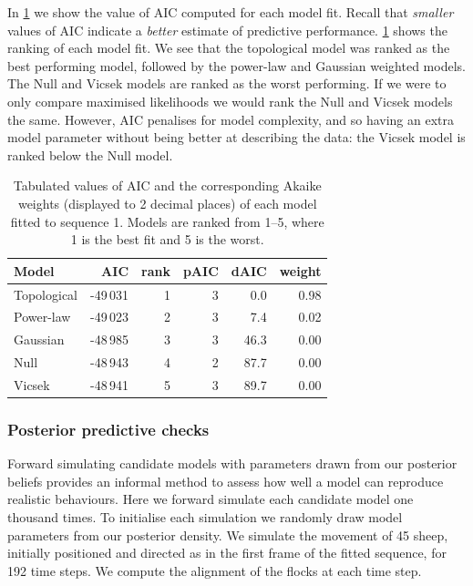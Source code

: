 In \cref{tab:aic_seq1} we show the value of AIC computed for each model fit.
Recall that \emph{smaller} values of AIC indicate a \emph{better} estimate of
predictive performance. \cref{tab:aic_seq1} shows the ranking of each model
fit. We see that the topological model was ranked as the best performing model,
followed by the power-law and Gaussian weighted models. The Null and Vicsek
models are ranked as the worst performing. If we were to only compare maximised
likelihoods we would rank the Null and Vicsek models the same. However, AIC
penalises for model complexity, and so having an extra model parameter without
being better at describing the data: the Vicsek model is ranked below the Null
model.

\begin{table}[tbp]
\begin{tabular}{@{}lrrrrr@{}}
\toprule
Model                       &      AIC & rank & pAIC & dAIC & weight \\
\midrule
Topological                 & -49\,031 &    1 &  3 &  0.0 &   0.98 \\
Power-law                   & -49\,023 &    2 &  3 &  7.4 &   0.02 \\
Gaussian                    & -48\,985 &    3 &  3 & 46.3 &   0.00 \\
Null                        & -48\,943 &    4 &  2 & 87.7 &   0.00 \\
Vicsek                      & -48\,941 &    5 &  3 & 89.7 &   0.00 \\
\bottomrule
\end{tabular}
\caption{Tabulated values of AIC and the corresponding Akaike weights
  (displayed to 2 decimal places) of each model fitted to sequence 1. Models
  are ranked from 1--5, where 1 is the best fit and 5 is the worst.}
\label{tab:aic_seq1}
\end{table}

\subsubsection{Posterior predictive checks}

Forward simulating candidate models with parameters drawn from our posterior
beliefs provides an informal method to assess how well a model can reproduce
realistic behaviours. Here we forward simulate each candidate model one
thousand times. To initialise each simulation we randomly draw model parameters
from our posterior density. We simulate the movement of 45 sheep, initially
positioned and directed as in the first frame of the fitted sequence, for 192
time steps. We compute the alignment of the flocks at each time step.

